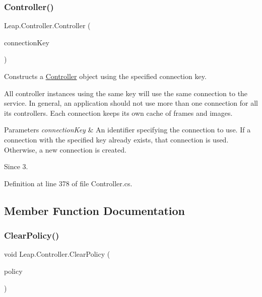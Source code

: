 \subsubsection{\texorpdfstring{Controller()}{Controller()}\hspace{0.1cm}{\footnotesize\ttfamily [2/2]}}
{\footnotesize\ttfamily Leap.\+Controller.\+Controller (\begin{DoxyParamCaption}\item[{int}]{connection\+Key }\end{DoxyParamCaption})}



Constructs a \mbox{\hyperlink{class_leap_1_1_controller}{Controller}} object using the specified connection key. 

All controller instances using the same key will use the same connection to the service. In general, an application should not use more than one connection for all its controllers. Each connection keeps its own cache of frames and images.


\begin{DoxyParams}{Parameters}
{\em connection\+Key} & An identifier specifying the connection to use. If a connection with the specified key already exists, that connection is used. Otherwise, a new connection is created. \\
\hline
\end{DoxyParams}
\begin{DoxySince}{Since}
3. 
\end{DoxySince}


Definition at line 378 of file Controller.\+cs.



\subsection{Member Function Documentation}
\mbox{\label{class_leap_1_1_controller_a78edc0a692fa7200a07eee4b651012a4}} 
\subsubsection{\texorpdfstring{ClearPolicy()}{ClearPolicy()}}
{\footnotesize\ttfamily void Leap.\+Controller.\+Clear\+Policy (\begin{DoxyParamCaption}\item[{\mbox{\hyperlink{class_leap_1_1_controller_a0bdb49fa94aa2da8b098c1ac296528d6}{Policy\+Flag}}}]{policy }\end{DoxyParamCaption})}



